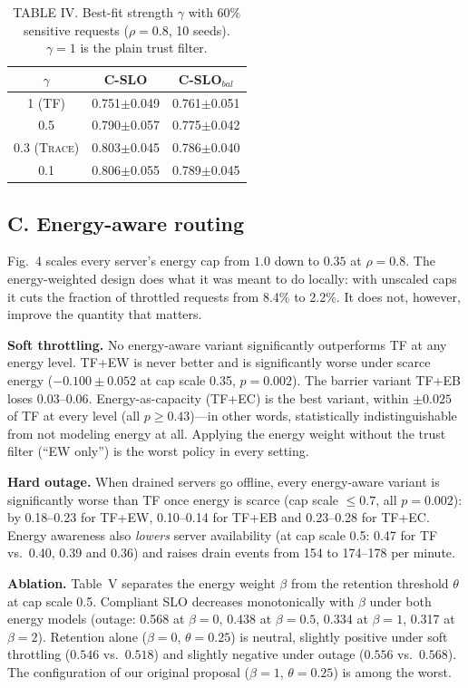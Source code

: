 \documentclass{article}
\newcommand{\sys}{\textsc{Trace}}
\begin{document}
\begin{table}[t]

\caption{TABLE IV. Best-fit strength $\gamma$ with 60\% sensitive requests ($\rho=0.8$, 10 seeds). $\gamma=1$ is the plain trust filter.}
\label{tab:gamma}
\footnotesize
\begin{tabular}{ccc}
\toprule
$\gamma$ & C-SLO & C-SLO$_{bal}$\\
\midrule
1 (TF) & 0.751$\pm$0.049 & 0.761$\pm$0.051 \\
0.5 & 0.790$\pm$0.057 & 0.775$\pm$0.042 \\
0.3 (\sys) & 0.803$\pm$0.045 & 0.786$\pm$0.040 \\
0.1 & 0.806$\pm$0.055 & 0.789$\pm$0.045 \\
\bottomrule
\end{tabular}
\end{table}

\subsection*{C. Energy-aware routing}

Fig.~4 scales every server's energy cap from $1.0$ down to $0.35$ at $\rho=0.8$. The energy-weighted design does what it was meant to do locally: with unscaled caps it cuts the fraction of throttled requests from 8.4\% to 2.2\%. It does not, however, improve the quantity that matters.

\textbf{Soft throttling.} No energy-aware variant significantly outperforms TF at any energy level. TF+EW is never better and is significantly worse under scarce energy ($-0.100\pm0.052$ at cap scale 0.35, $p=0.002$). The barrier variant TF+EB loses $0.03$--$0.06$. Energy-as-capacity (TF+EC) is the best variant, within $\pm0.025$ of TF at every level (all $p\ge0.43$)---in other words, statistically indistinguishable from not modeling energy at all. Applying the energy weight without the trust filter (``EW only'') is the worst policy in every setting.

\textbf{Hard outage.} When drained servers go offline, every energy-aware variant is significantly worse than TF once energy is scarce (cap scale $\le0.7$, all $p=0.002$): by 0.18--0.23 for TF+EW, 0.10--0.14 for TF+EB and 0.23--0.28 for TF+EC. Energy awareness also \emph{lowers} server availability (at cap scale 0.5: 0.47 for TF vs.\ 0.40, 0.39 and 0.36) and raises drain events from 154 to 174--178 per minute.

\textbf{Ablation.} Table~V separates the energy weight $\beta$ from the retention threshold $\theta$ at cap scale 0.5. Compliant SLO decreases monotonically with $\beta$ under both energy models (outage: 0.568 at $\beta=0$, 0.438 at $\beta=0.5$, 0.334 at $\beta=1$, 0.317 at $\beta=2$). Retention alone ($\beta=0$, $\theta=0.25$) is neutral, slightly positive under soft throttling ($0.546$ vs.\ $0.518$) and slightly negative under outage ($0.556$ vs.\ $0.568$). The configuration of our original proposal ($\beta=1$, $\theta=0.25$) is among the worst.
\end{document}
